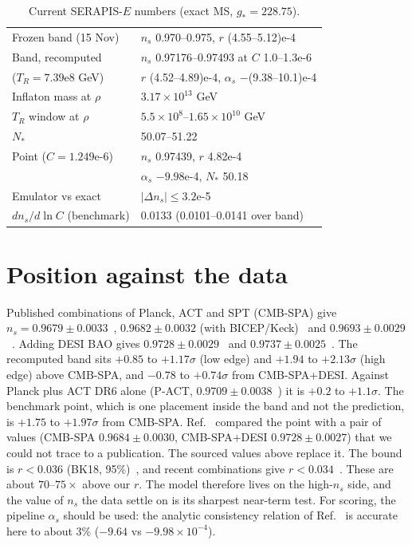 \documentclass[aps,prd,twocolumn,superscriptaddress,nofootinbib,showkeys]{revtex4-2}
\begin{document}
\begin{table}[b]
\caption{Current SERAPIS-$E$ numbers (exact MS, $g_*=228.75$).}
\label{tab:num}
\begin{ruledtabular}\footnotesize
\begin{tabular}{ll}
Frozen band (15 Nov) & $n_s$ 0.970--0.975, $r$ (4.55--5.12)e-4\\
Band, recomputed & $n_s$ 0.97176--0.97493 at $C$ 1.0--1.3e-6\\
 ($T_R=7.39$e8 GeV) & $r$ (4.52--4.89)e-4, $\alpha_s$ $-$(9.38--10.1)e-4\\
Inflaton mass at $\rho$ & $3.17\times10^{13}$ GeV\\
$T_R$ window at $\rho$ & $5.5\times10^8$--$1.65\times10^{10}$ GeV\\
$N_*$ & 50.07--51.22\\
Point ($C=1.249$e-6) & $n_s$ 0.97439, $r$ 4.82e-4\\
 & $\alpha_s$ $-9.98$e-4, $N_*$ 50.18\\
Emulator vs exact & $|\Delta n_s|\le3.2$e-5\\
$dn_s/d\ln C$ (benchmark) & 0.0133 (0.0101--0.0141 over band)
\end{tabular}
\end{ruledtabular}
\end{table}

\section{Position against the data}
Published combinations of Planck, ACT and SPT (CMB-SPA) give $n_s=0.9679\pm0.0033$~\cite{SPT}, $0.9682\pm0.0032$ (with BICEP/Keck)~\cite{Balk} and $0.9693\pm0.0029$~\cite{McDF}. Adding DESI BAO gives $0.9728\pm0.0029$~\cite{Balk} and $0.9737\pm0.0025$~\cite{McDF}. The recomputed band sits $+0.85$ to $+1.17\sigma$ (low edge) and $+1.94$ to $+2.13\sigma$ (high edge) above CMB-SPA, and $-0.78$ to $+0.74\sigma$ from CMB-SPA+DESI. Against Planck plus ACT DR6 alone (P-ACT, $0.9709\pm0.0038$~\cite{ACT,McDF}) it is $+0.2$ to $+1.1\sigma$. The benchmark point, which is one placement inside the band and not the prediction, is $+1.75$ to $+1.97\sigma$ from CMB-SPA. Ref.~\cite{P5} compared the point with a pair of values (CMB-SPA $0.9684\pm0.0030$, CMB-SPA+DESI $0.9728\pm0.0027$) that we could not trace to a publication. The sourced values above replace it. The bound is $r<0.036$ (BK18, 95\%)~\cite{BK18}, and recent combinations give $r<0.034$~\cite{Balk}. These are about $70$--$75\times$ above our $r$. The model therefore lives on the high-$n_s$ side, and the value of $n_s$ the data settle on is its sharpest near-term test. For scoring, the pipeline $\alpha_s$ should be used: the analytic consistency relation of Ref.~\cite{P1} is accurate here to about 3\% ($-9.64$ vs $-9.98\times10^{-4}$).
\end{document}
